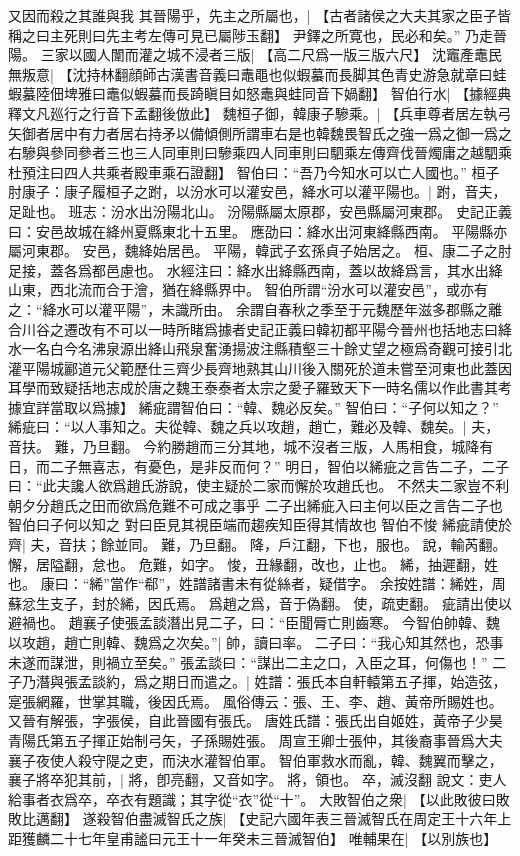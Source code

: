 又因而殺之其誰與我
其晉陽乎，先主之所屬也，|{
	【古者諸侯之大夫其家之臣子皆稱之曰主死則曰先主考左傳可見已屬陟玉翻】}
尹鐸之所寛也，民必和矣。”
乃走晉陽。
三家以國人闈而灌之城不浸者三版|{
	【高二尺爲一版三版六尺】}
沈竈產鼃民無叛意|{
	【沈持林翻顔師古漢書音義曰鼃黽也似蝦蟇而長脚其色青史游急就章曰蛙蝦蟇陸佃埤雅曰鼃似蝦蟇而長踦瞋目如怒鼃與蛙同音下媧翻】}
智伯行水|{
	【據經典釋文凡廵行之行音下孟翻後倣此】
	}
魏桓子御，韓康子驂乘。|{
	【兵車尊者居左執弓矢御者居中有力者居右持矛以備傾側所謂車右是也韓魏畏智氏之強一爲之御一爲之右驂與參同參者三也三人同車則曰驂乘四人同車則曰駟乘左傳齊伐晉燭庸之越駟乘杜預注曰四人共乘者殿車乘石證翻】
	}
智伯曰：“吾乃今知水可以亡人國也。”
桓子肘康子：康子履桓子之跗，以汾水可以灌安邑，絳水可以灌平陽也。|{
	跗，音夫，足趾也。
	班志：汾水出汾陽北山。
	汾陽縣屬太原郡，安邑縣屬河東郡。
	史記正義曰：安邑故城在絳州夏縣東北十五里。
	應劭曰：絳水出河東絳縣西南。
	平陽縣亦屬河東郡。
	安邑，魏絳始居邑。
	平陽，韓武子玄孫貞子始居之。
	桓、康二子之肘足接，蓋各爲都邑慮也。
	水經注曰：絳水出絳縣西南，蓋以故絳爲言，其水出絳山東，西北流而合于澮，猶在絳縣界中。
	智伯所謂“汾水可以灌安邑”，或亦有之：“絳水可以灌平陽”，未識所由。
	余謂自春秋之季至于元魏歷年滋多郡縣之離合川谷之遷改有不可以一時所睹爲據者史記正義曰韓初都平陽今晉州也括地志曰絳水一名白今名沸泉源出絳山飛泉奮湧揚波注縣積壑三十餘丈望之極爲奇觀可接引北灌平陽城酈道元父範歷仕三齊少長齊地熟其山川後入關死於道未嘗至河東也此蓋因耳學而致疑括地志成於唐之魏王泰泰者太宗之愛子羅致天下一時名儒以作此書其考據宜詳當取以爲據】}
絺疵謂智伯曰：“韓、魏必反矣。”
智伯曰：“子何以知之？”
絺疵曰：“以人事知之。夫從韓、魏之兵以攻趙，趙亡，難必及韓、魏矣。|{
	夫，音扶。
	難，乃旦翻。
	}
今約勝趙而三分其地，城不沒者三版，人馬相食，城降有日，而二子無喜志，有憂色，是非反而何？”
明日，智伯以絺疵之言告二子，二子曰：“此夫讒人欲爲趙氏游說，使主疑於二家而懈於攻趙氏也。
不然夫二家豈不利朝夕分趙氏之田而欲爲危難不可成之事乎
二子出絺疵入曰主何以臣之言告二子也
智伯曰子何以知之
對曰臣見其視臣端而趨疾知臣得其情故也
智伯不悛
絺疵請使於齊|{
	夫，音扶；餘並同。
	難，乃旦翻。
	降，戶江翻，下也，服也。
	說，輸芮翻。
	懈，居隘翻，怠也。
	危難，如字。
	悛，丑緣翻，改也，止也。
	絺，抽遲翻，姓也。
	康曰：“絺”當作“郗”，姓譜諸書未有從絲者，疑借字。
	余按姓譜：絺姓，周蘇忿生支子，封於絺，因氏焉。
	爲趙之爲，音于偽翻。
	使，疏吏翻。
	疵請出使以避禍也。
	}
趙襄子使張孟談潛出見二子，曰：“臣聞脣亡則齒寒。
今智伯帥韓、魏以攻趙，趙亡則韓、魏爲之次矣。”|{
	帥，讀曰率。
	}
二子曰：“我心知其然也，恐事未遂而謀泄，則禍立至矣。”
張孟談曰：“謀出二主之口，入臣之耳，何傷也！”
二子乃潛與張孟談約，爲之期日而遣之。|{
	姓譜：張氏本自軒轅第五子揮，始造弦，寔張網羅，世掌其職，後因氏焉。
	風俗傳云：張、王、李、趙、黃帝所賜姓也。
	又晉有解張，字張侯，自此晉國有張氏。
	唐姓氏譜：張氏出自姬姓，黃帝子少昊青陽氏第五子揮正始制弓矢，子孫賜姓張。
	周宣王卿士張仲，其後裔事晉爲大夫
	}
襄子夜使人殺守隄之吏，而決水灌智伯軍。
智伯軍救水而亂，韓、魏翼而擊之，襄子將卒犯其前，|{
	將，卽亮翻，又音如字。
	將，領也。
	卒，滅沒翻
	說文：吏人給事者衣爲卒，卒衣有題識；其字從“衣”從“十”。
	}
大敗智伯之衆|{
	【以此敗彼曰敗敗比邁翻】
	}
遂殺智伯盡滅智氏之族|{
	【史記六國年表三晉滅智氏在周定王十六年上距獲麟二十七年皇甫謐曰元王十一年癸未三晉滅智伯】
	}
唯輔果在|{
	【以別族也】
	}

